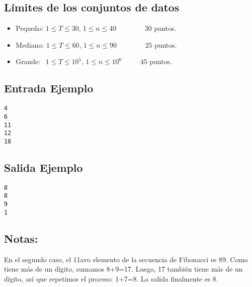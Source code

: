 \subsection*{Límites de los conjuntos de datos}

\begin{itemize}
    \item Pequeño: $ 1 \leq T \leq 30 $, $ 1 \leq n \leq 40 $ $\quad \quad \quad \;\,$ $30$ puntos.
    \item Mediano: $ 1\leq T \leq 60 $, $ 1 \leq n \leq 90 $ $\quad \quad \quad \;\,$ $25$ puntos.
    \item Grande: $ \,\; 1\leq T \leq 10^5 $, $ 1 \leq n \leq 10^6 $ $\quad \quad$ $45$ puntos.
\end{itemize}

\begin{multicols}{2}
\subsection*{Entrada Ejemplo}
\begin{verbatim}
4
6
11
12
18
\end{verbatim}
\columnbreak
\subsection*{Salida Ejemplo}
\begin{verbatim}
8
8
9
1
\end{verbatim}
\end{multicols}

\subsection*{Notas:}
En el segundo caso, el 11avo elemento de la secuencia de Fibonacci es 89. Como tiene más de un dígito, sumamos 8+9=17. Luego, 17 también tiene más de un dígito, así que repetimos el proceso: 1+7=8. La salida finalmente es 8.